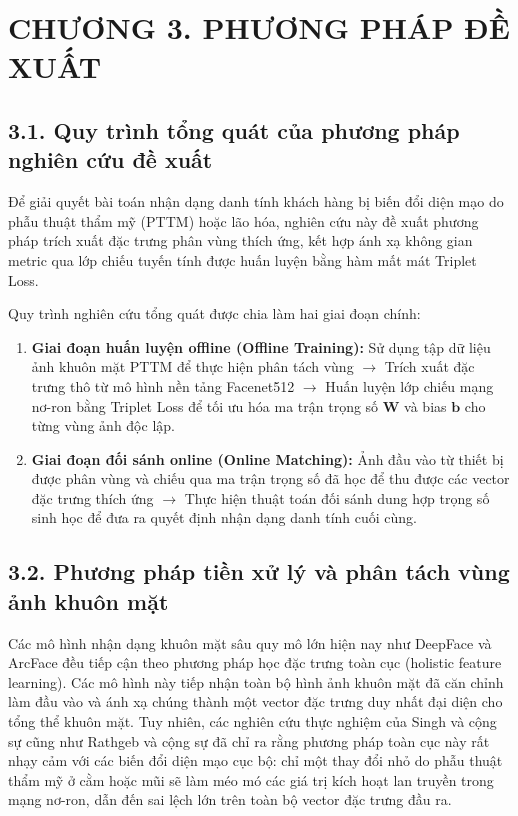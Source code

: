 \section*{CHƯƠNG 3. PHƯƠNG PHÁP ĐỀ XUẤT}
\setcounter{section}{3}
\setcounter{subsection}{0}
\setcounter{figure}{0}
\setcounter{table}{0}

\subsection*{3.1. Quy trình tổng quát của phương pháp nghiên cứu đề xuất}

Để giải quyết bài toán nhận dạng danh tính khách hàng bị biến đổi diện mạo do phẫu thuật thẩm mỹ (PTTM) hoặc lão hóa, nghiên cứu này đề xuất phương pháp trích xuất đặc trưng phân vùng thích ứng, kết hợp ánh xạ không gian metric qua lớp chiếu tuyến tính được huấn luyện bằng hàm mất mát Triplet Loss. 

Quy trình nghiên cứu tổng quát được chia làm hai giai đoạn chính:
\begin{enumerate}
    \item \textbf{Giai đoạn huấn luyện offline (Offline Training):} 
    Sử dụng tập dữ liệu ảnh khuôn mặt PTTM để thực hiện phân tách vùng $\rightarrow$ Trích xuất đặc trưng thô từ mô hình nền tảng Facenet512 $\rightarrow$ Huấn luyện lớp chiếu mạng nơ-ron bằng Triplet Loss để tối ưu hóa ma trận trọng số $\bm{W}$ và bias $\bm{b}$ cho từng vùng ảnh độc lập.
    \item \textbf{Giai đoạn đối sánh online (Online Matching):} 
    Ảnh đầu vào từ thiết bị được phân vùng và chiếu qua ma trận trọng số đã học để thu được các vector đặc trưng thích ứng $\rightarrow$ Thực hiện thuật toán đối sánh dung hợp trọng số sinh học để đưa ra quyết định nhận dạng danh tính cuối cùng.
\end{enumerate}

\newpage
\subsection*{3.2. Phương pháp tiền xử lý và phân tách vùng ảnh khuôn mặt}

Các mô hình nhận dạng khuôn mặt sâu quy mô lớn hiện nay như DeepFace \cite{deepface_framework} và ArcFace \cite{arcface} đều tiếp cận theo phương pháp học đặc trưng toàn cục (holistic feature learning). Các mô hình này tiếp nhận toàn bộ hình ảnh khuôn mặt đã căn chỉnh làm đầu vào và ánh xạ chúng thành một vector đặc trưng duy nhất đại diện cho tổng thể khuôn mặt. Tuy nhiên, các nghiên cứu thực nghiệm của Singh và cộng sự \cite{singh2010database} cũng như Rathgeb và cộng sự \cite{rathgeb2020obstacle} đã chỉ ra rằng phương pháp toàn cục này rất nhạy cảm với các biến đổi diện mạo cục bộ: chỉ một thay đổi nhỏ do phẫu thuật thẩm mỹ ở cằm hoặc mũi sẽ làm méo mó các giá trị kích hoạt lan truyền trong mạng nơ-ron, dẫn đến sai lệch lớn trên toàn bộ vector đặc trưng đầu ra. 

